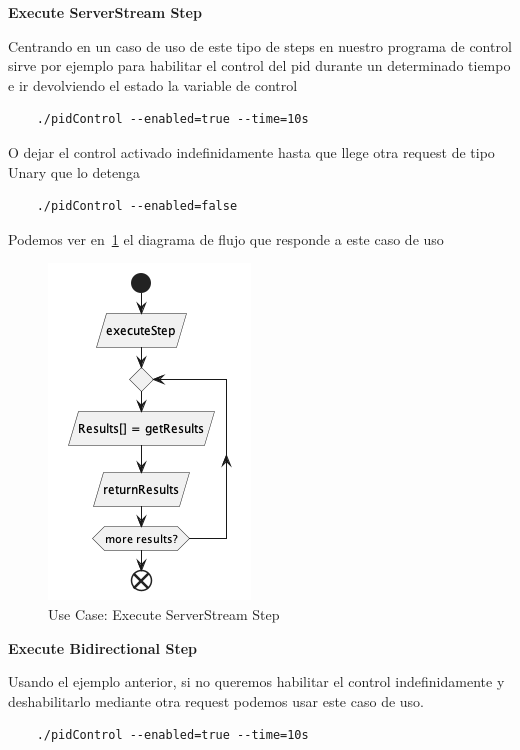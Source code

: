 \textbf{Execute ServerStream Step}

Centrando en un caso de uso de este tipo de steps en nuestro programa de control sirve por ejemplo para habilitar el control del pid durante un determinado tiempo e ir devolviendo el estado la variable de control
\begin{verbatim}
    ./pidControl --enabled=true --time=10s
\end{verbatim}

O dejar el control activado indefinidamente hasta que llege otra request de tipo Unary que lo detenga

\begin{verbatim}
    ./pidControl --enabled=false
\end{verbatim}

Podemos ver en~\cref{fig:Use Case-Execute ServerStream Step} el diagrama de flujo que responde a este caso de uso

\begin{figure}[H]
    \centering
    \includegraphics[height=0.2\textheight]{./part/Proyecto_ejecutivo/memoria_descriptiva/descripcionDelProyecto/client/uml/executeServerStreamStep}
    \caption{Use Case: Execute ServerStream Step}\label{fig:Use Case-Execute ServerStream Step}
\end{figure}

\textbf{Execute Bidirectional Step}

Usando el ejemplo anterior, si no queremos habilitar el control indefinidamente y deshabilitarlo mediante otra request podemos usar este caso de uso.

\begin{verbatim}
    ./pidControl --enabled=true --time=10s
\end{verbatim}

